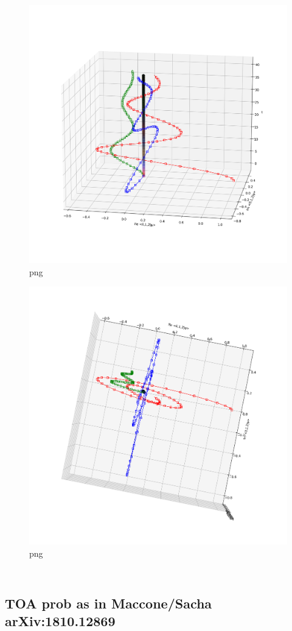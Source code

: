 \begin{figure}
\centering
\includegraphics[width=0.666\linewidth]{tex/appendix/nb/jupyter/3lev/output_58_0.png}
\caption{png}
\end{figure}

\begin{figure}
\centering
\includegraphics[width=0.666\linewidth]{tex/appendix/nb/jupyter/3lev/output_58_1.png}
\caption{png}
\end{figure}

\begin{lstlisting}[language=Python]
\end{lstlisting}

\begin{lstlisting}[language=Python]
\end{lstlisting}

\hypertarget{toa-prob-as-in-macconesacha-arxiv1810.12869}{%
\subsection{TOA prob as in Maccone/Sacha
arXiv:1810.12869}\label{toa-prob-as-in-macconesacha-arxiv1810.12869}}

